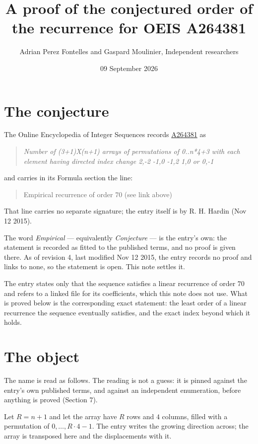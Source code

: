 \documentclass[11pt]{article}
\title{A proof of the conjectured order of the recurrence for OEIS A264381}
\author{Adrian Perez Fontelles and Gaspard Moulinier, Independent researchers}
\date{09 September 2026}
\theoremstyle{definition}
\begin{document}
\maketitle
\section{The conjecture}

The Online Encyclopedia of Integer Sequences records \href{https://oeis.org/A264381}{A264381} as

\begin{quote}\itshape Number of (3+1)X(n+1) arrays of permutations of 0..n*4+3 with each element having directed index change 2,-2 -1,0 -1,2 1,0 or 0,-1\end{quote}

and carries in its Formula section the line:

\begin{quote}\ttfamily Empirical recurrence of order 70 (see link above)\end{quote}

That line carries no separate signature; the entry itself is by R. H. Hardin (Nov 12 2015).

The word {\itshape Empirical} --- equivalently {\itshape Conjecture} --- is the entry's own: the statement is recorded as fitted to the published terms, and no proof is given there. As of revision 4, last modified Nov 12 2015, the entry records no proof and links to none, so the statement is open. This note settles it.

The entry states only that the sequence satisfies a linear recurrence of order $70$ and refers to a linked file for its coefficients, which this note does not use. What is proved below is the corresponding exact statement: the least order of a linear recurrence the sequence eventually satisfies, and the exact index beyond which it holds.

\section{The object}

The name is read as follows. The reading is not a guess: it is pinned against the entry's own published terms, and against an independent enumeration, before anything is proved (Section 7).

Let $R = n + 1$ and let the array have $R$ rows and $4$ columns, filled with a permutation of $0,\dots,R\cdot4-1$. The entry writes the growing direction across; the array is transposed here and the displacements with it.
\end{document}
